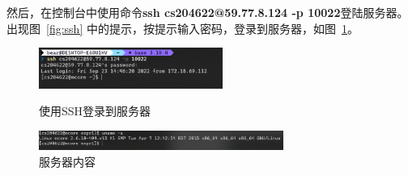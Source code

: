\documentclass[a4paper,twoside]{article}
\begin{document}
\begin{spacing}{1.2}
然后，在控制台中使用命令\textbf{ssh cs204622@59.77.8.124 -p 10022}登陆服务器。出现图~\ref{fig:ssh}
中的提示，按提示输入密码，登录到服务器，如图~\ref{fig:server}。

\begin{figure}[htb]
	\centering
	\begin{minipage}[t]{0.48\textwidth}
		\centering
		\includegraphics[width=6.0cm]{ssh.png}
		\caption{使用SSH登录到服务器}
		\label{fig:ssh}
	\end{minipage}
	\begin{minipage}[t]{0.48\textwidth}
		\centering
		\includegraphics[width=8.0cm]{server.png}
		\caption{服务器内容}
		\label{fig:server}
	\end{minipage}
\end{figure}


\end{spacing}
\end{document}
